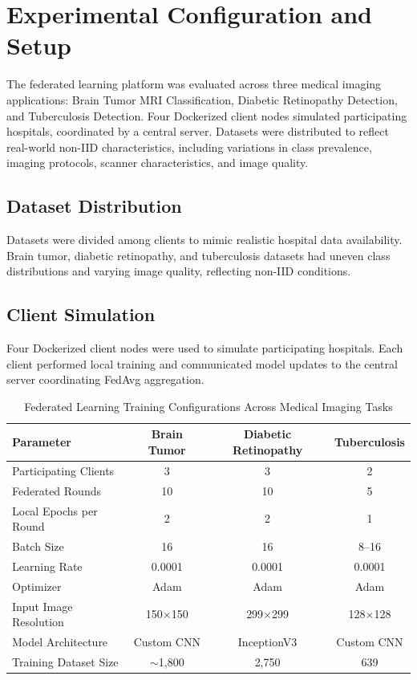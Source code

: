 \section{Experimental Configuration and Setup}
\label{sec:exp_setup}

The federated learning platform was evaluated across three medical imaging applications: Brain Tumor MRI Classification, Diabetic Retinopathy Detection, and Tuberculosis Detection. Four Dockerized client nodes simulated participating hospitals, coordinated by a central server. Datasets were distributed to reflect real-world non-IID characteristics, including variations in class prevalence, imaging protocols, scanner characteristics, and image quality.

\subsection{Dataset Distribution}
\label{sec:dataset_distribution}
Datasets were divided among clients to mimic realistic hospital data availability. Brain tumor, diabetic retinopathy, and tuberculosis datasets had uneven class distributions and varying image quality, reflecting non-IID conditions.

\subsection{Client Simulation}
\label{sec:client_simulation}
Four Dockerized client nodes were used to simulate participating hospitals. Each client performed local training and communicated model updates to the central server coordinating FedAvg aggregation.

\begin{table}[!ht]
\centering
\caption{Federated Learning Training Configurations Across Medical Imaging Tasks}
\label{tab:config}
\begin{tabular}{|l|c|c|c|}
\hline
\textbf{Parameter} & \textbf{Brain Tumor} & \textbf{Diabetic Retinopathy} & \textbf{Tuberculosis} \\
\hline
Participating Clients & 3 & 3 & 2 \\
Federated Rounds & 10 & 10 & 5 \\
Local Epochs per Round & 2 & 2 & 1 \\
Batch Size & 16 & 16 & 8--16 \\
Learning Rate & 0.0001 & 0.0001 & 0.0001 \\
Optimizer & Adam & Adam & Adam \\
Input Image Resolution & 150×150 & 299×299 & 128×128 \\
Model Architecture & Custom CNN & InceptionV3 & Custom CNN \\
Training Dataset Size & $\sim$1,800 & 2,750 & 639 \\
\hline
\end{tabular}
\end{table}

